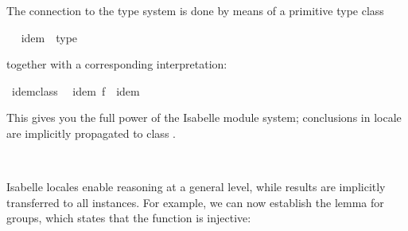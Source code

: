 \begin{isabellebody}
\endisatagquote
{\isafoldquote}%
%
\isadelimquote
%
\endisadelimquote
%
\begin{isamarkuptext}%
\noindent The connection to the type system is done by means
  of a primitive type class%
\end{isamarkuptext}%
\isamarkuptrue%
\ %
\isadeliminvisible
%
\endisadeliminvisible
%
\isataginvisible
%
\endisataginvisible
{\isafoldinvisible}%
%
\isadeliminvisible
%
\endisadeliminvisible
%
\isadelimquote
%
\endisadelimquote
%
\isatagquote
{}\isamarkupfalse%
\ idem\ {}\ type%
\endisatagquote
{\isafoldquote}%
%
\isadelimquote
%
\endisadelimquote
%
\isadeliminvisible
%
\endisadeliminvisible
%
\isataginvisible
%
\endisataginvisible
{\isafoldinvisible}%
%
\isadeliminvisible
%
\endisadeliminvisible
%
\begin{isamarkuptext}%
\noindent together with a corresponding interpretation:%
\end{isamarkuptext}%
\isamarkuptrue%
%
\isadelimquote
%
\endisadelimquote
%
\isatagquote
{}\isamarkupfalse%
\ idem{}class{}\isanewline
\ \ idem\ {}f\ {}\ {}{}{}idem{}\ {}\ {}{}%
\endisatagquote
{\isafoldquote}%
%
\isadelimquote
%
\endisadelimquote
%
\begin{isamarkuptext}%
\noindent This gives you the full power of the Isabelle module system;
  conclusions in locale  are implicitly propagated
  to class .%
\end{isamarkuptext}%
\isamarkuptrue%
\ %
\isadeliminvisible
%
\endisadeliminvisible
%
\isataginvisible
%
\endisataginvisible
{\isafoldinvisible}%
%
\isadeliminvisible
%
\endisadeliminvisible
%
\isamarkuptrue%
%
\begin{isamarkuptext}%
Isabelle locales enable reasoning at a general level, while results
  are implicitly transferred to all instances.  For example, we can
  now establish the  lemma for groups, which
  states that the function  is injective:%

\end{isamarkuptext}
\end{isabellebody}
